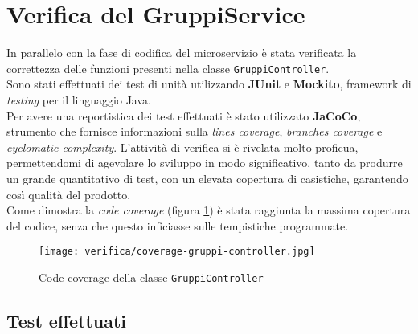 \section{Verifica del GruppiService}
In parallelo con la fase di codifica del \gls{microservizio}
 è stata verificata la correttezza delle funzioni
presenti nella classe \texttt{GruppiController}. \\
Sono stati effettuati dei test di unità utilizzando \textbf{JUnit} e
\textbf{Mockito}, \gls{framework} di \textit{testing} per il linguaggio Java.\\
Per avere una reportistica dei test effettuati è stato utilizzato
\textbf{JaCoCo}, strumento che fornisce informazioni sulla \textit{lines
    coverage}, \textit{branches coverage} e \textit{cyclomatic complexity}.
L'attività di verifica si è rivelata molto proficua, permettendomi di agevolare
lo sviluppo in modo significativo, tanto da produrre un
grande quantitativo di test, con un elevata copertura di casistiche, garantendo
così qualità del prodotto.\\
Come dimostra la \textit{code coverage} (figura \ref{img:code-coverage}) è
stata raggiunta la massima copertura del codice, senza che questo inficiasse
sulle tempistiche programmate.

\begin{figure}[H]

    \centerline{\texttt{[image: verifica/coverage-gruppi-controller.jpg]}}

    \caption{Code coverage della classe \texttt{GruppiController}}
    \label{img:code-coverage}
\end{figure}

\subsection{Test effettuati}



